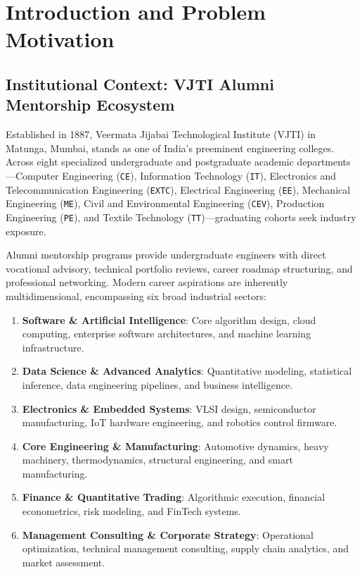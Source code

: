\chapter{Introduction and Problem Motivation}
\label{ch:intro}

\section{Institutional Context: VJTI Alumni Mentorship Ecosystem}
Established in 1887, Veermata Jijabai Technological Institute (VJTI) in Matunga, Mumbai, stands as one of India's preeminent engineering colleges. Across eight specialized undergraduate and postgraduate academic departments—Computer Engineering (\texttt{CE}), Information Technology (\texttt{IT}), Electronics and Telecommunication Engineering (\texttt{EXTC}), Electrical Engineering (\texttt{EE}), Mechanical Engineering (\texttt{ME}), Civil and Environmental Engineering (\texttt{CEV}), Production Engineering (\texttt{PE}), and Textile Technology (\texttt{TT})—graduating cohorts seek industry exposure.

Alumni mentorship programs provide undergraduate engineers with direct vocational advisory, technical portfolio reviews, career roadmap structuring, and professional networking. Modern career aspirations are inherently multidimensional, encompassing six broad industrial sectors:
\begin{enumerate}
    \item \textbf{Software \& Artificial Intelligence}: Core algorithm design, cloud computing, enterprise software architectures, and machine learning infrastructure.
    \item \textbf{Data Science \& Advanced Analytics}: Quantitative modeling, statistical inference, data engineering pipelines, and business intelligence.
    \item \textbf{Electronics \& Embedded Systems}: VLSI design, semiconductor manufacturing, IoT hardware engineering, and robotics control firmware.
    \item \textbf{Core Engineering \& Manufacturing}: Automotive dynamics, heavy machinery, thermodynamics, structural engineering, and smart manufacturing.
    \item \textbf{Finance \& Quantitative Trading}: Algorithmic execution, financial econometrics, risk modeling, and FinTech systems.
    \item \textbf{Management Consulting \& Corporate Strategy}: Operational optimization, technical management consulting, supply chain analytics, and market assessment.
\end{enumerate}

